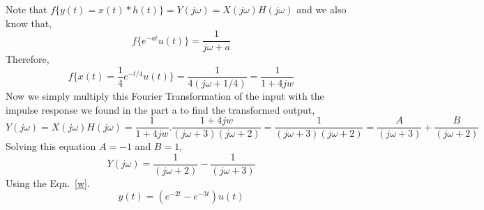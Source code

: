 \documentclass[10pt,a4paper, margin=1in]{article}
\begin{document}
\begin{enumerate}
\begin{enumerate}
    Note that $f\{y(t)=x(t)*h(t)\}=Y(j\omega)=X(j\omega)H(j\omega)$ and we also know that, 
    \begin{equation}\label{w}
    	f\{e^{-at}u(t)\}=\frac{1}{j\omega+a}
    \end{equation}	
    Therefore,
    \begin{equation}
    	f\{x(t)=\frac{1}{4}e^{-t/4}u(t)\}=\frac{1}{4(j\omega+1/4)}=\frac{1}{1+4jw}
    \end{equation}
    Now we simply multiply this Fourier Transformation of the input with the impulse response we found in the part a to find the transformed output,
    \begin{equation}
	Y(j\omega)=X(j\omega)H(j\omega)=\frac{1}{1+4jw}.\frac{1+4jw}{(j\omega+3)(j\omega+2)}=\frac{1}{(j\omega+3)(j\omega+2)}=\frac{A}{(j\omega+3)}+\frac{B}{(j\omega+2)}
    \end{equation}
    Solving this equation $A=-1$ and $B=1$,
    \begin{equation}
    	Y(j\omega)=\frac{1}{(j\omega+2)}-\frac{1}{(j\omega+3)}
    \end{equation}
    Using the Eqn.~\ref{w}.
    \begin{equation}
    	y(t)=(e^{-2t}-e^{-3t})u(t)
    \end{equation}
    
    \end{enumerate}

\end{enumerate}
\end{document}
